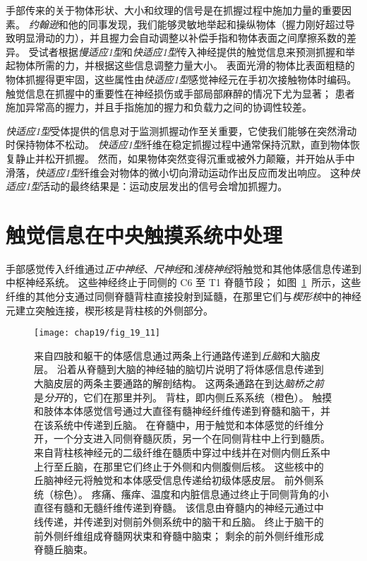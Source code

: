 手部传来的关于物体形状、大小和纹理的信号是在抓握过程中施加力量的重要因素。
\textit{约翰逊}和他的同事发现，我们能够灵敏地举起和操纵物体（握力刚好超过导致明显滑动的力），并且握力会自动调整以补偿手指和物体表面之间摩擦系数的差异。
受试者根据\textit{慢适应1型}和\textit{快适应1型}传入神经提供的触觉信息来预测抓握和举起物体所需的力，并根据这些信息调整力量大小。
表面光滑的物体比表面粗糙的物体抓握得更牢固，这些属性由\textit{快适应1型}感觉神经元在手初次接触物体时编码。
触觉信息在抓握中的重要性在神经损伤或手部局部麻醉的情况下尤为显著；
患者施加异常高的握力，并且手指施加的握力和负载力之间的协调性较差。


\textit{快适应1型}受体提供的信息对于监测抓握动作至关重要，它使我们能够在突然滑动时保持物体不松动。
\textit{快适应1型}纤维在稳定抓握过程中通常保持沉默，直到物体恢复静止并松开抓握。
然而，如果物体突然变得沉重或被外力颠簸，并开始从手中滑落，\textit{快适应1型}纤维会对物体的微小切向滑动运动作出反应而发出响应。
这种\textit{快适应1型}活动的最终结果是：运动皮层发出的信号会增加抓握力。



\section{触觉信息在中央触摸系统中处理}

手部感觉传入纤维通过\textit{正中神经}、\textit{尺神经}和\textit{浅桡神经}将触觉和其他体感信息传递到中枢神经系统。
这些神经终止于同侧的 C6 至 T1 脊髓节段；
如图~\ref{fig:19_11}~所示，这些纤维的其他分支通过同侧脊髓背柱直接投射到延髓，在那里它们与\textit{楔形核}中的神经元建立突触连接，楔形核是背柱核的外侧部分。


\begin{figure}[htbp]
	\centering
	\texttt{[image: chap19/fig\_19\_11]}
	\caption{来自四肢和躯干的体感信息通过两条上行通路传递到\textit{丘脑}和大脑皮层。
		沿着从脊髓到大脑的神经轴的脑切片说明了将体感信息传递到大脑皮层的两条主要通路的解剖结构。
		这两条通路在到达\textit{脑桥之前}是\textit{分开}的，它们在那里并列。
		背柱，即内侧丘系系统（橙色）。
		触摸和肢体本体感觉信号通过大直径有髓神经纤维传递到脊髓和脑干，并在该系统中传递到丘脑。
		在脊髓中，用于触觉和本体感觉的纤维分开，一个分支进入同侧脊髓灰质，另一个在同侧背柱中上行到髓质。 
		来自背柱核神经元的二级纤维在髓质中穿过中线并在对侧内侧丘系中上行至丘脑，在那里它们终止于外侧和内侧腹侧后核。
		这些核中的丘脑神经元将触觉和本体感受信息传递给初级体感皮层。 前外侧系统（棕色）。
		疼痛、瘙痒、温度和内脏信息通过终止于同侧背角的小直径有髓和无髓纤维传递到脊髓。
		该信息由脊髓内的神经元通过中线传递，并传递到对侧前外侧系统中的脑干和丘脑。
		终止于脑干的前外侧纤维组成脊髓网状束和脊髓中脑束； 剩余的前外侧纤维形成脊髓丘脑束。}
	\label{fig:19_11}
\end{figure}



